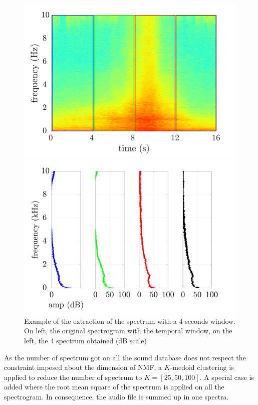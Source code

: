 \documentclass[twocolumn,a4paper,10pt]{article}
\begin{document}
\begin{figure}[!t]
\centering
	\begin{minipage}[t]{.24\textwidth}
		\centering
		\includegraphics[width=.9\linewidth]{../image/extractionDictionary1Example.pdf} 
	\end{minipage}
	\begin{minipage}[t]{.24\textwidth}
		\centering
		\includegraphics[width=.9\linewidth]{../image/extractionDictionary2Example.pdf} 
	\end{minipage}
	\caption{Example of the extraction of the spectrum with a 4 seconds window. On left, the original spectrogram with the temporal window, on the left, the 4 spectrum obtained (dB scale)}
	\label{fig:dictionaryExtraction}
\end{figure}

As the number of spectrum got on all the sound database does not respect the constraint imposed about the dimension of NMF, a $K$-medoid clustering is applied to reduce the number of spectrum to $K = \left[ 25, 50, 100 \right]$. A special case is added where the root mean square of the spectrum is applied on all the spectrogram. In consequence, the audio file is summed up in one spectra. 
\end{document}
